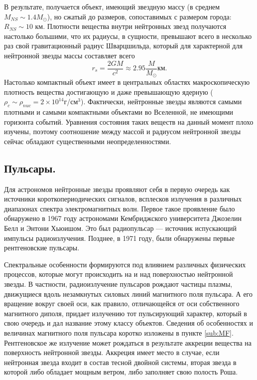 \documentclass[14pt,a4paper]{extarticle}
\newcommand{\be}{\begin{equation}}
\newcommand{\ee}{\end{equation}}
\begin{document}
			В результате, получается объект, имеющий звездную массу (в среднем $M_{NS}\sim1.4 M_{\odot}$), но сжатый до размеров, сопоставимых с размером города: $R_{NS}\sim10$ км. 
			Плотности вещества внутри нейтронных звезд получаются настолько большими, что их радиусы, в сущности, превышают всего в несколько раз свой гравитационный радиус Шварцшильда, который для характерной для нейтронной звезды массы составляет всего
			\be r_s=\frac{2 G M}{c^2}\approx 
			   2.95
			   \frac{M}{M_{\odot}}
			   \text{км}.
			\ee
			Настолько компактный объект имеет в центральных областях макроскопическую плотность вещества достигающую и даже превышающую ядерную ($\rho_c \sim \rho_{nuc}=2\times10^{14}$г/см$^3$). 
			Фактически, нейтронные звезды являются самыми плотными и самыми компактными объектами во Вселенной, не имеющими горизонта событий.
			Уравнения состояния таких веществ на данный момент плохо изучены, поэтому соотношение между массой и радиусом нейтронной звезды сейчас обладают существенными неопределенностями.

		\subsection{Пульсары.} %
		\label{sub:PSR}

		    Для астрономов нейтронные звезды проявляют себя в первую очередь как источники короткопериодических сигналов, всплесков излучения в различных диапазонах спектра электромагнитных волн. 
			Первое такое проявление было обнаружено в 1967 году \cite{Hewish1968} астрономами Кембриджского университета Джозелин Белл и Энтони Хьюишом. 
			Это был радиопульсар --- источник испускающий импульсы радиоизлучения. 
			Позднее, в 1971 году, были обнаружены первые рентгеновские пульсары.

		    Спектральные особенности формируются под влиянием различных физических процессов, которые могут происходить на и над поверхностью нейтронной звезды. 
		    В частности, радиоизлучение пульсаров рождают частицы плазмы, движущиеся вдоль незамкнутых силовых линий магнитного поля пульсара. 
		    А его вращение вокруг своей оси, как правило, отличающейся от оси собственного магнитного диполя, придает излучению тот пульсирующий характер, который в свою очередь и дал название этому классу объектов.  
		    Сведения об особенностях и величинах магнитного поля пульсара коротко изложены в пункте \ref{sub:MF}.
		    Рентгеновское же излучение может рождаться в результате аккреции вещества на поверхность нейтронной звезды.
		    Аккреция имеет место в случае, если нейтронная звезда входит в состав тесной двойной системы, вторая звезда в которой либо обладает мощным ветром, либо заполняет свою полость Роша.
\end{document}
